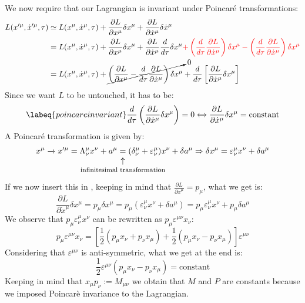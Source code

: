 \documentclass[../main.tex]{subfiles}
\begin{document}
We now require that our Lagrangian is invariant under Poincaré transformations:
\begin{align*}
L(x'^\mu,\Dot{x}'^\mu,\tau)&\simeq L(x^\mu,\Dot{x}^\mu,\tau)+\frac{\partial L}{\partial x^\mu}\delta x^\mu+\frac{\partial L}{\partial\Dot{x}^\mu}\delta\Dot{x}^\mu\\
&=L(x^\mu,\Dot{x}^\mu,\tau)+\frac{\partial L}{\partial x^\mu}\delta x^\mu+\frac{\partial L}{\partial\Dot{x}^\mu}\frac{d}{d\tau}\delta x^\mu{\color{red}+\left(\frac{d}{d\tau}\frac{\partial L}{\partial\Dot{x}^\mu}\right)\delta x^\mu-\left(\frac{d}{d\tau}\frac{\partial L}{\partial\Dot{x}^\mu}\right)\delta x^\mu}\\
&=L(x^\mu,\Dot{x}^\mu,\tau)+\cancelto{0}{\left(\frac{\partial L}{\partial x^\mu}-\frac{d}{d\tau}\frac{\partial L}{\partial\Dot{x}^\mu}\right)\delta x^\mu}+\frac{d}{d\tau}\left[\frac{\partial L}{\partial\Dot{x}^\mu}\delta x^\mu\right]
\end{align*}
Since we want $L$ to be untouched, it has to be:
\begin{equation}
\labeq{poincareinvariant}
\frac{d}{d\tau}\left(\frac{\partial L}{\partial\Dot{x}^{\mu}}\delta x^{\mu}\right)=0\xleftrightarrow[]{}\frac{\partial L}{\partial\Dot{x}^{\mu}}\delta x^{\mu}=\text{constant}
\end{equation}
A Poincaré transformation is given by:
\[
x^{\mu}\xrightarrow[]{}x'^{\mu}=\Lambda^{\mu}_{\nu}x^{\nu}+a^{\mu}\underset{\mathclap{\tikz \node {$\uparrow$} node [below=1ex] {\footnotesize infinitesimal transformation };}}=(\delta^{\mu}_{\nu}+\varepsilon^{\mu}_{\nu})x^{\nu}+\delta a^{\mu}\Rightarrow\delta x^{\mu}=\varepsilon^{\mu}_{\nu}x^{\nu}+\delta a^{\mu}
\]
If we now insert this in , keeping in mind that $\frac{\partial L}{\partial\Dot{x}^\mu}=p_\mu$, what we get is:
\[
\frac{\partial L}{\partial\dot{x}^{\mu}}\delta x^{\mu}=p_{\mu}\delta x^{\mu}=p_{\mu}(\varepsilon^{\mu}_{\nu}x^{\nu}+\delta a^{\mu})=p_{\mu}\varepsilon^{\mu}_{\nu}x^{\nu}+p_{\mu}\delta a^{\mu}
\]
We observe that $p_{\mu}\varepsilon^{\mu}_{\nu}x^{\nu}$ can be rewritten as $p_{\mu}\varepsilon^{\mu\nu}x_{\nu}$:
\[
p_{\mu}\varepsilon^{\mu\nu}x_{\nu}=\left[\frac{1}{2}(p_{\mu}x_{\nu}+p_{\nu}x_{\mu})+\frac{1}{2}(p_{\mu}x_{\nu}-p_{\nu}x_{\mu})\right]\varepsilon^{\mu\nu}
\]
Considering that $\varepsilon^{\mu\nu}$ is anti-symmetric, what we get at the end is:
\[
\frac{1}{2}\varepsilon^{\mu\nu}(p_{\mu}x_{\nu}-p_{\nu}x_{\mu})=\text{constant}
\]
Keeping in mind that $x_{\mu}p_{\nu}:=M_{\mu\nu}$ we obtain that $M$ and $P$ are constants because we imposed Poincarè invariance to the Lagrangian.
\end{document}
